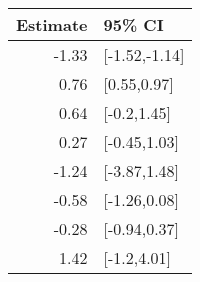 \begin{tabular}{rl}
  \hline
Estimate & 95\% CI \\ 
  \hline
-1.33 & [-1.52,-1.14] \\ 
  0.76 & [0.55,0.97] \\ 
  0.64 & [-0.2,1.45] \\ 
  0.27 & [-0.45,1.03] \\ 
  -1.24 & [-3.87,1.48] \\ 
  -0.58 & [-1.26,0.08] \\ 
  -0.28 & [-0.94,0.37] \\ 
  1.42 & [-1.2,4.01] \\ 
   \hline
\end{tabular}

